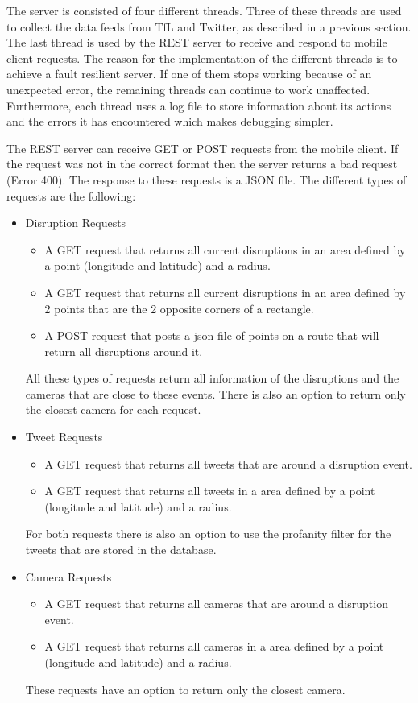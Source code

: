 The server is consisted of four different threads. Three of these threads are used to collect the data feeds from TfL and Twitter, as described in a previous section. The last thread is used by the REST server to receive and respond to mobile client requests. The reason for the implementation of the different threads is to achieve a fault resilient server. If one of them stops working because of an unexpected error, the remaining threads can continue to work unaffected. Furthermore, each thread uses a log file to store information about its actions and the errors it has encountered which makes debugging simpler.

The REST server can receive GET or POST requests from the mobile client. If the request was not in the correct format then the server returns a bad request (Error 400). The response to these requests is a JSON file. The different types of requests are the following:

\begin{itemize}
\item Disruption Requests
  \begin{itemize}
  \item A GET request that returns all current disruptions in an area defined by a point (longitude and latitude) and a radius.
  \item A GET request that returns all current disruptions in an area defined by 2 points that are the 2 opposite corners of a rectangle.
  \item A POST request that posts a json file of points on a route that will return all disruptions around it.
  \end{itemize}
  All these types of requests return all information of the disruptions and the cameras that are close to these events. There is also an option to return only the closest camera for each request.
\item Tweet Requests
  \begin{itemize}
  \item A GET request that returns all tweets that are around a disruption event.
  \item A GET request that returns all tweets in a area defined by a point (longitude and latitude) and a radius.
  \end{itemize}
  For both requests there is also an option to use the profanity filter for the tweets that are stored in the database.
\item Camera Requests
  \begin{itemize}
  \item A GET request that returns all cameras that are around a disruption event.
  \item A GET request that returns all cameras in a area defined by a point (longitude and latitude) and a radius.
  \end{itemize}
  These requests have an option to return only the closest camera.
\end{itemize}
